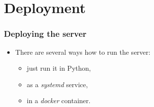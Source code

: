 \documentclass[compress,table,xcolor=table]{beamer}
\begin{document}
\section{Deployment}
\begin{frame}
  \frametitle{Deploying the server}
  \LARGE
  \begin{itemize}
  \item There are several ways how to run the server:
    \begin{itemize}
    \item just run it in Python,
    \item as a {\em systemd} service,
    \item in a {\em docker} container.
    \end{itemize}
  \end{itemize}
\end{frame}
\end{document}
